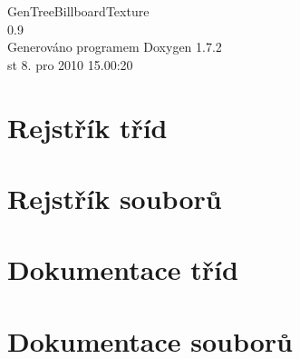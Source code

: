 \documentclass[a4paper]{book}
\begin{document}
\hypersetup{pageanchor=false}
\begin{titlepage}
\vspace*{7cm}
\begin{center}
{\Large GenTreeBillboardTexture \\[1ex]\large 0.9 }\\
\vspace*{1cm}
{\large Generováno programem Doxygen 1.7.2}\\
\vspace*{0.5cm}
{\small st 8. pro 2010 15.00:20}\\
\end{center}
\end{titlepage}
\clearemptydoublepage
{}
\tableofcontents
\clearemptydoublepage
{}
\hypersetup{pageanchor=true}
\chapter{Rejstřík tříd}

\chapter{Rejstřík souborů}

\chapter{Dokumentace tříd}








\chapter{Dokumentace souborů}













\printindex
\end{document}
